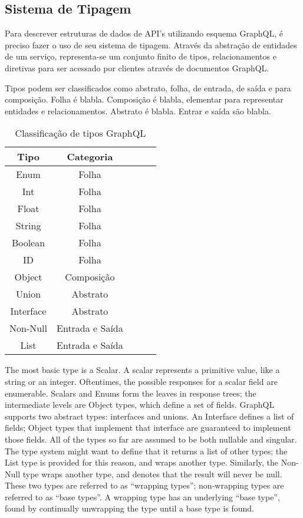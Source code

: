 \subsection[Sistema de Tipagem]{Sistema de Tipagem}

Para descrever estruturas de dados de API's utilizando esquema GraphQL, é preciso fazer o uso de seu sistema de tipagem. Através da abstração de entidades de um serviço, representa-se um conjunto finito de tipos, relacionamentos e diretivas para ser acessado por clientes através de documentos GraphQL.

Tipos podem ser classificados como abstrato, folha, de entrada, de saída e para composição.  Folha é blabla. Composição é blabla, elementar para representar entidades e relacionamentos. Abstrato é blabla. Entrar e saída são blabla.

\begin{table}[H]
  \centering
  \begin{tabular}{|c|c|c|c|c|}
    \hline
    Tipo & Categoria \\
    \hline
    Enum & Folha \\
    \hline
    Int & Folha \\
    \hline
    Float & Folha \\
    \hline
    String & Folha \\
    \hline
    Boolean & Folha \\
    \hline
    ID & Folha \\
    \hline
    Object & Composição \\
    \hline
    Union & Abstrato \\
    \hline
    Interface & Abstrato \\
    \hline    
    Non-Null & Entrada e Saída \\
    \hline
  	List & Entrada e Saída \\
    \hline
  \end{tabular}
  \caption{Classificação de tipos GraphQL}
\end{table}

The most basic type is a Scalar. A scalar represents a primitive value, like a string or an integer. Oftentimes, the possible responses for a scalar field are enumerable. Scalars and Enums form the leaves in response trees; the intermediate levels are Object types, which define a set of fields. GraphQL supports two abstract types: interfaces and unions. An Interface defines a list of fields; Object types that implement that interface are guaranteed to implement those fields. All of the types so far are assumed to be both nullable and singular. The type system might want to define that it returns a list of other types; the List type is provided for this reason, and wraps another type. Similarly, the Non-Null type wraps another type, and denotes that the result will never be null. These two types are referred to as “wrapping types”; non-wrapping types are referred to as “base types”. A wrapping type has an underlying “base type”, found by continually unwrapping the type until a base type is found.

